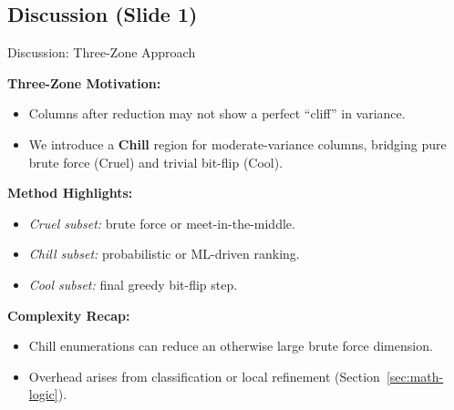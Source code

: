 \documentclass{beamer}
\begin{document}
\subsection*{Discussion (Slide 1)}
\begin{frame}{Discussion: Three-Zone Approach}

\textbf{Three-Zone Motivation:}
\begin{itemize}
  \item Columns after reduction may not show a perfect ``cliff'' in variance.
  \item We introduce a \textbf{Chill} region for moderate-variance columns, 
        bridging pure brute force (Cruel) and trivial bit-flip (Cool).
\end{itemize}

\textbf{Method Highlights:}
\begin{itemize}
  \item \emph{Cruel subset:} brute force or meet-in-the-middle.
  \item \emph{Chill subset:} probabilistic or ML-driven ranking.
  \item \emph{Cool subset:} final greedy bit-flip step.
\end{itemize}

\textbf{Complexity Recap:}
\begin{itemize}
  \item Chill enumerations can reduce an otherwise large brute force dimension.
  \item Overhead arises from classification or local refinement (Section~\ref{sec:math-logic}).
\end{itemize}
\end{frame}
\end{document}
